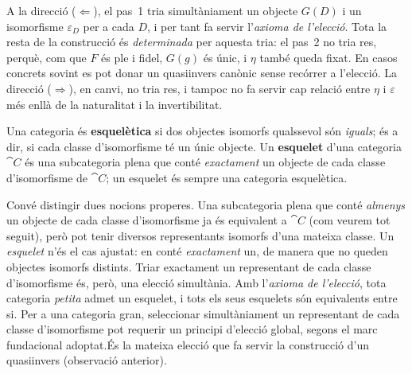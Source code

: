 \begin{observacio}
A la direcció ($\Leftarrow$), el pas~1 tria simultàniament un objecte $G(D)$ i un isomorfisme $\varepsilon_D$ per a cada $D$, i per tant fa servir l'\emph{axioma de l'elecció}.\footnotemark{} Tota la resta de la construcció és \emph{determinada} per aquesta tria: el pas~2 no tria res, perquè, com que $F$ és ple i fidel, $G(g)$ és únic, i $\eta$ també queda fixat. En casos concrets sovint es pot donar un quasiinvers canònic sense recórrer a l'elecció. La direcció ($\Rightarrow$), en canvi, no tria res, i tampoc no fa servir cap relació entre $\eta$ i $\varepsilon$ més enllà de la naturalitat i la invertibilitat.
\end{observacio}
%

\begin{definicio}[Esquelet]\label{def:esquelet}
Una categoria és \textbf{esquelètica} si dos objectes isomorfs qualssevol són \emph{iguals}; és a dir, si cada classe d'isomorfisme té un únic objecte. Un \textbf{esquelet} d'una categoria $\cat{C}$ és una subcategoria plena que conté \emph{exactament} un objecte de cada classe d'isomorfisme de $\cat{C}$; un esquelet és sempre una categoria esquelètica.
\end{definicio}

\begin{observacio}
Convé distingir dues nocions properes. Una subcategoria plena que conté \emph{almenys} un objecte de cada classe d'isomorfisme ja és equivalent a $\cat{C}$ (com veurem tot seguit), però pot tenir diversos representants isomorfs d'una mateixa classe. Un \emph{esquelet} n'és el cas ajustat: en conté \emph{exactament} un, de manera que no queden objectes isomorfs distints. Triar exactament un representant de cada classe d'isomorfisme és, però, una elecció simultània. Amb l'\emph{axioma de l'elecció}, tota categoria \emph{petita} admet un esquelet, i tots els seus esquelets són equivalents entre si. Per a una categoria gran, seleccionar simultàniament un representant de cada classe d'isomorfisme pot requerir un principi d'elecció global, segons el marc fundacional adoptat.\footnotemark És la mateixa elecció que fa servir la construcció d'un quasiinvers (observació anterior).
\end{observacio}
%

